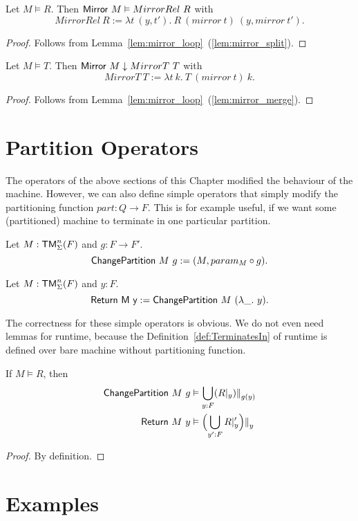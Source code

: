 \begin{lemma}
  Let $M \vDash R$.  Then $\textsf{Mirror}~M \vDash MirrorRel~R$ with
  \[
    MirrorRel~R := \lambda t~(y, t').~ R~(mirror~t)~(y, mirror~t').
  \]
\end{lemma}
\begin{proof}
  Follows from Lemma~\ref{lem:mirror_loop}~(\ref{lem:mirror_split}).
\end{proof}
\begin{lemma}
  Let $M \vDash T$.  Then $\textsf{Mirror}~M \downarrow MirrorT~T$ with
  \[
    MirrorT~T := \lambda t~k.~ T~(mirror~t)~k.
  \]
\end{lemma}
\begin{proof}
  Follows from Lemma~\ref{lem:mirror_loop}~(\ref{lem:mirror_merge}).
\end{proof}




\section{Partition Operators}
\label{sec:partition-op}

The operators of the above sections of this Chapter modified the behaviour of the machine.  However, we can also define simple operators that simply
modify the partitioning function $part : Q \to F$.  This is for example useful, if we want some (partitioned) machine to terminate in one particular
partition.

\begin{definition}[$\MS{ChangePartition}$]
  Let $M:\textsf{TM}_\Sigma^n(F)$ and $g : F \to F'$.
  \[ \textsf{ChangePartition}~M~g := (M, param_M \circ g). \]
\end{definition}

\begin{definition}
  Let $M:\textsf{TM}_\Sigma^n(F)$ and $y:F$.
  \[ \textsf{Return~M~y} := \textsf{ChangePartition}~M~(\lambda \_.~y). \]
\end{definition}

The correctness for these simple operators is obvious.  We do not even need lemmas for runtime, because the Definition~\ref{def:TerminatesIn} of
runtime is defined over bare machine without partitioning function.
\begin{lemma}
  If $M \vDash R$, then
  \begin{alignat*}{1}
    \textsf{ChangePartition}~M~g & \vDash \bigcup_{y:F} (R {|}_{y}) {|\mkern-1.5mu|}_{g(y)} \\
    \textsf{Return}~M~y          & \vDash \Bigl( \bigcup_{y':F} R {|}_{y}' \Bigr) {|\mkern-1.5mu|}_{y}
  \end{alignat*}
\end{lemma}
\begin{proof}
  By definition.
\end{proof}


\section{Examples}
\label{sec:combining-examples}





